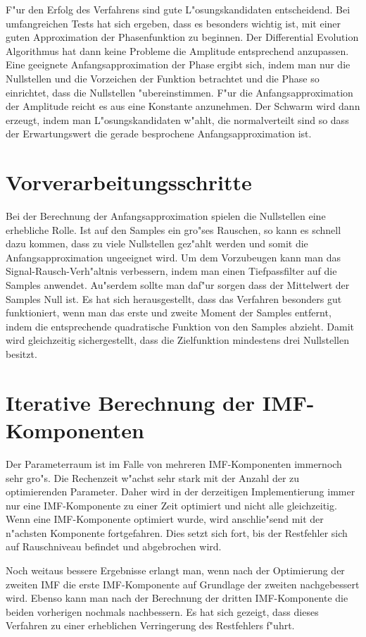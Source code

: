 \documentclass[a4paper]{scrartcl}
\begin{document}
F"ur den Erfolg des Verfahrens sind gute L"osungskandidaten entscheidend. 
Bei umfangreichen Tests hat sich ergeben, dass es besonders wichtig ist, mit einer guten Approximation der Phasenfunktion zu beginnen. 
Der Differential Evolution Algorithmus hat dann keine Probleme die Amplitude entsprechend anzupassen. 
Eine geeignete Anfangsapproximation der Phase ergibt sich, indem man nur die Nullstellen und die Vorzeichen der Funktion betrachtet und die Phase so einrichtet, dass die Nullstellen "ubereinstimmen. 
F"ur die Anfangsapproximation der Amplitude reicht es aus eine Konstante anzunehmen. 
Der Schwarm wird dann erzeugt, indem man L"osungskandidaten w"ahlt, die normalverteilt sind so dass der Erwartungswert die gerade besprochene Anfangsapproximation ist. 


\section{Vorverarbeitungsschritte}

Bei der Berechnung der Anfangsapproximation spielen die Nullstellen eine erhebliche Rolle. 
Ist auf den Samples ein gro"ses Rauschen, so kann es schnell dazu kommen, dass zu viele Nullstellen gez"ahlt werden und somit die Anfangsapproximation ungeeignet wird. 
Um dem Vorzubeugen kann man das Signal-Rausch-Verh"altnis verbessern, indem man einen Tiefpassfilter auf die Samples anwendet. 
Au"serdem sollte man daf"ur sorgen dass der Mittelwert der Samples Null ist. 
Es hat sich herausgestellt, dass das Verfahren besonders gut funktioniert, wenn man das erste und zweite Moment der Samples entfernt, indem die entsprechende quadratische Funktion von den Samples abzieht.
Damit wird gleichzeitig sichergestellt, dass die Zielfunktion mindestens drei Nullstellen besitzt. 


\section{Iterative Berechnung der IMF-Komponenten}

Der Parameterraum ist im Falle von mehreren IMF-Komponenten immernoch sehr gro"s. 
Die Rechenzeit w"achst sehr stark mit der Anzahl der zu optimierenden Parameter. 
Daher wird in der derzeitigen Implementierung immer nur eine IMF-Komponente zu einer Zeit optimiert und nicht alle gleichzeitig. 
Wenn eine IMF-Komponente optimiert wurde, wird anschlie"send mit der n"achsten Komponente fortgefahren. 
Dies setzt sich fort, bis der Restfehler sich auf Rauschniveau befindet und abgebrochen wird. 

Noch weitaus bessere Ergebnisse erlangt man, wenn nach der Optimierung der zweiten IMF die erste IMF-Komponente auf Grundlage der zweiten nachgebessert wird. 
Ebenso kann man nach der Berechnung der dritten IMF-Komponente die beiden vorherigen nochmals nachbessern.
Es hat sich gezeigt, dass dieses Verfahren zu einer erheblichen Verringerung des Restfehlers f"uhrt. 



%
%
\end{document}
